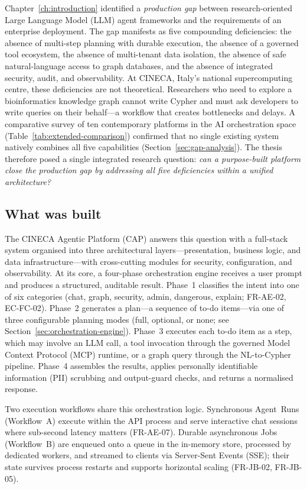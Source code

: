 \documentclass[a4paper,noexaminfo]{sapthesis}
\begin{document}
Chapter~\ref{ch:introduction} identified a \emph{production gap} between
research-oriented Large Language Model (LLM) agent frameworks and the
requirements of an enterprise deployment.  The gap manifests as five
compounding deficiencies: the absence of multi-step planning with durable
execution, the absence of a governed tool ecosystem, the absence of
multi-tenant data isolation, the absence of safe natural-language access to
graph databases, and the absence of integrated security, audit, and
observability.  At CINECA, Italy's national supercomputing centre, these
deficiencies are not theoretical.  Researchers who need to explore a
bioinformatics knowledge graph cannot write Cypher and must ask developers
to write queries on their behalf---a workflow that creates bottlenecks and
delays.  A comparative survey of ten contemporary platforms in the AI
orchestration space (Table~\ref{tab:extended-comparison}) confirmed that no
single existing system natively combines all five capabilities
(Section~\ref{sec:gap-analysis}).  The thesis therefore posed a single
integrated research question: \emph{can a purpose-built platform close the
production gap by addressing all five deficiencies within a unified
architecture?}

\subsection{What was built}

The CINECA Agentic Platform (CAP) answers this question with a full-stack
system organised into three architectural layers---presentation, business
logic, and data infrastructure---with cross-cutting modules for security,
configuration, and observability.  At its core, a four-phase orchestration
engine receives a user prompt and produces a structured, auditable result.
Phase~1 classifies the intent into one of six categories (chat, graph,
security, admin, dangerous, explain; FR-AE-02, EC-FC-02).  Phase~2
generates a plan---a sequence of to-do items---via one of three
configurable planning modes (full, optional, or none; see
Section~\ref{sec:orchestration-engine}).  Phase~3
executes each to-do item as a step, which may involve an LLM call, a tool
invocation through the governed Model Context Protocol (MCP) runtime, or a
graph query through the NL-to-Cypher pipeline.  Phase~4 assembles the
results, applies personally identifiable information (PII) scrubbing and
output-guard checks, and returns a normalised response.

Two execution workflows share this orchestration logic.  Synchronous
Agent~Runs (Workflow~A) execute within the API process and serve
interactive chat sessions where sub-second latency matters (FR-AE-07).
Durable asynchronous Jobs (Workflow~B) are enqueued onto a queue in the
in-memory store, processed by dedicated workers, and streamed to clients via Server-Sent
Events (SSE); their state survives process restarts and supports horizontal
scaling (FR-JB-02, FR-JB-05).
\end{document}
